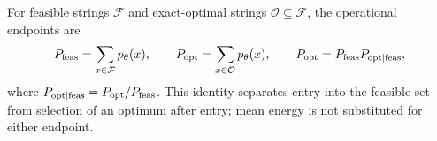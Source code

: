 For feasible strings $\mathcal F$ and exact-optimal strings
$\mathcal O\subseteq\mathcal F$, the operational endpoints are
\begin{equation}
 P_{\mathrm{feas}}=\sum_{x\in\mathcal F}p_\theta(x),\qquad
 P_{\mathrm{opt}}=\sum_{x\in\mathcal O}p_\theta(x),\qquad
 P_{\mathrm{opt}}=P_{\mathrm{feas}}P_{\mathrm{opt}\mid\mathrm{feas}},
 \label{eq:decomposition}
\end{equation}
where $P_{\mathrm{opt}\mid\mathrm{feas}}=P_{\mathrm{opt}}/P_{\mathrm{feas}}$. This identity separates entry into the feasible
set from selection of an optimum after entry; mean energy is not substituted
for either endpoint.
